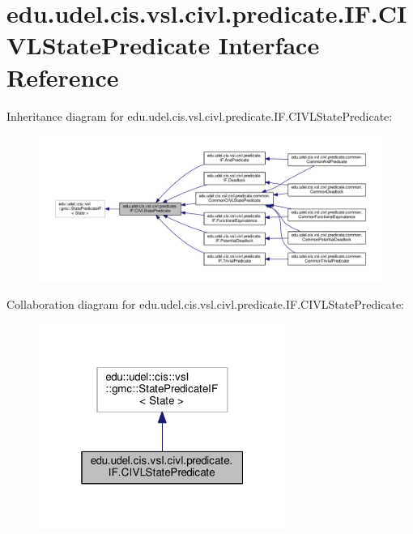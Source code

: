 \hypertarget{interfaceedu_1_1udel_1_1cis_1_1vsl_1_1civl_1_1predicate_1_1IF_1_1CIVLStatePredicate}{}\section{edu.\+udel.\+cis.\+vsl.\+civl.\+predicate.\+I\+F.\+C\+I\+V\+L\+State\+Predicate Interface Reference}
\label{interfaceedu_1_1udel_1_1cis_1_1vsl_1_1civl_1_1predicate_1_1IF_1_1CIVLStatePredicate}


Inheritance diagram for edu.\+udel.\+cis.\+vsl.\+civl.\+predicate.\+I\+F.\+C\+I\+V\+L\+State\+Predicate\+:
\nopagebreak
\begin{figure}[H]
\begin{center}
\leavevmode
\includegraphics[width=350pt]{interfaceedu_1_1udel_1_1cis_1_1vsl_1_1civl_1_1predicate_1_1IF_1_1CIVLStatePredicate__inherit__graph}
\end{center}
\end{figure}


Collaboration diagram for edu.\+udel.\+cis.\+vsl.\+civl.\+predicate.\+I\+F.\+C\+I\+V\+L\+State\+Predicate\+:
\nopagebreak
\begin{figure}[H]
\begin{center}
\leavevmode
\includegraphics[width=229pt]{interfaceedu_1_1udel_1_1cis_1_1vsl_1_1civl_1_1predicate_1_1IF_1_1CIVLStatePredicate__coll__graph}
\end{center}
\end{figure}

